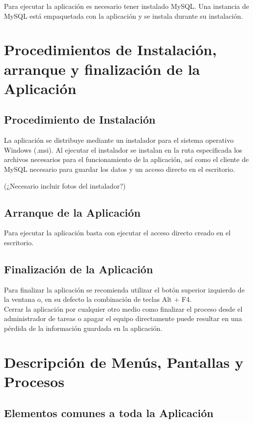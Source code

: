 \documentclass[12pt, a4paper]{book}
\begin{document}
Para ejecutar la aplicación es necesario tener instalado MySQL. Una instancia de MySQL está empaquetada con la aplicación y se instala durante su instalación.

\section{Procedimientos de Instalación, arranque y finalización de la Aplicación}

\subsection{Procedimiento de Instalación}

La aplicación se distribuye mediante un instalador para el sistema operativo Windows (.msi). Al ejecutar el instalador se instalan en la ruta especificada los archivos necesarios para el funcionamiento de la aplicación, así como el cliente de MySQL necesario para guardar los datos y un acceso directo en el escritorio.

(¿Necesario incluir fotos del instalador?)


\subsection{Arranque de la Aplicación}

Para ejecutar la aplicación basta con ejecutar el acceso directo creado en el escritorio.


\subsection{Finalización de la Aplicación}

Para finalizar la aplicación se recomienda utilizar el botón superior izquierdo de la ventana o, en su defecto la combinación de teclas Alt + F4.\\

Cerrar la aplicación por cualquier otro medio como finalizar el proceso desde el administrador de tareas o apagar el equipo directamente puede resultar en una pérdida de la información guardada en la aplicación.

\newpage

\section{Descripción de Menús, Pantallas y Procesos}

\subsection{Elementos comunes a toda la Aplicación}
\end{document}

